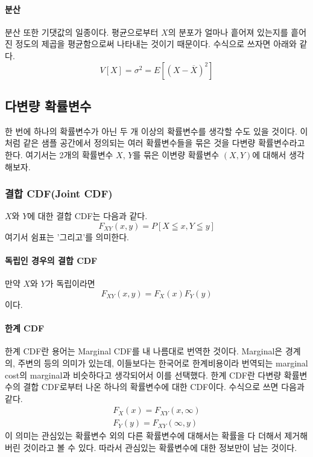 \paragraph{분산}
분산 또한 기댓값의 일종이다. 평균으로부터 $X$의 분포가 얼마나 흩어져 있는지를 흩어진 정도의 제곱을 평균함으로써 나타내는 것이기 때문이다.
수식으로 쓰자면 아래와 같다.
\begin{equation}
    V[X]=\sigma^2=E[(X-\overline{X})^2]
\end{equation}

\subsection{다변량 확률변수}
한 번에 하나의 확률변수가 아닌 두 개 이상의 확률변수를 생각할 수도 있을 것이다. 이처럼 같은 샘플 공간에서 정의되는 여러 확률변수들을 묶은 것을 다변량 확률변수라고 한다.
여기서는 2개의 확률변수 $X$, $Y$를 묶은 이변량 확률변수 $(X,Y)$에 대해서 생각해보자.
\subsubsection{결합 CDF(Joint CDF)}
$X$와 $Y$에 대한 결합 CDF는 다음과 같다.
\begin{equation}
    F_{XY}(x,y)=P[X\leqq x , Y\leqq y]
\end{equation}
여기서 쉼표는 '그리고'를 의미한다.
\paragraph{독립인 경우의 결합 CDF}
만약 $X$와 $Y$가 독립이라면
\begin{equation}
    F_{XY}(x,y)=F_X(x)F_Y(y)
\end{equation}
이다.
\paragraph{한계 CDF}
한계 CDF란 용어는 Marginal CDF를 내 나름대로 번역한 것이다. Marginal은 경계의, 주변의 등의 의미가 있는데, 이들보다는 한국어로 한계비용이라 번역되는 marginal cost의 marginal과 비슷하다고 생각되어서 이를 선택했다.
한계 CDF란 다변량 확률변수의 결합 CDF로부터 나온 하나의 확률변수에 대한 CDF이다. 수식으로 쓰면 다음과 같다.
\begin{eqnarray}
    F_X(x)=F_{XY}(x,\infty)\nonumber\\
    F_Y(y)=F_{XY}(\infty,y)
\end{eqnarray}
이 의미는 관심있는 확률변수 외의 다른 확률변수에 대해서는 확률을 다 더해서 제거해 버린 것이라고 볼 수 있다. 따라서 관심있는 확률변수에 대한 정보만이 남는 것이다.
